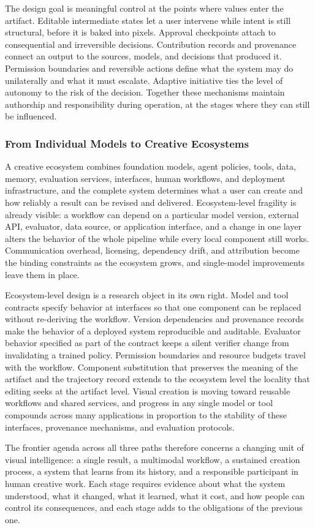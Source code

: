 The design goal is meaningful control at the points where values enter the artifact. Editable intermediate states let a user intervene while intent is still structural, before it is baked into pixels. Approval checkpoints attach to consequential and irreversible decisions. Contribution records and provenance connect an output to the sources, models, and decisions that produced it. Permission boundaries and reversible actions define what the system may do unilaterally and what it must escalate. Adaptive initiative ties the level of autonomy to the risk of the decision. Together these mechanisms maintain authorship and responsibility during operation, at the stages where they can still be influenced.

\subsubsection{From Individual Models to Creative Ecosystems}

A creative ecosystem combines foundation models, agent policies, tools, data, memory, evaluation services, interfaces, human workflows, and deployment infrastructure, and the complete system determines what a user can create and how reliably a result can be revised and delivered. Ecosystem-level fragility is already visible: a workflow can depend on a particular model version, external API, evaluator, data source, or application interface, and a change in one layer alters the behavior of the whole pipeline while every local component still works. Communication overhead, licensing, dependency drift, and attribution become the binding constraints as the ecosystem grows, and single-model improvements leave them in place.

Ecosystem-level design is a research object in its own right. Model and tool contracts specify behavior at interfaces so that one component can be replaced without re-deriving the workflow. Version dependencies and provenance records make the behavior of a deployed system reproducible and auditable. Evaluator behavior specified as part of the contract keeps a silent verifier change from invalidating a trained policy. Permission boundaries and resource budgets travel with the workflow. Component substitution that preserves the meaning of the artifact and the trajectory record extends to the ecosystem level the locality that editing seeks at the artifact level. Visual creation is moving toward reusable workflows and shared services, and progress in any single model or tool compounds across many applications in proportion to the stability of these interfaces, provenance mechanisms, and evaluation protocols.

The frontier agenda across all three paths therefore concerns a changing unit of visual intelligence: a single result, a multimodal workflow, a sustained creation process, a system that learns from its history, and a responsible participant in human creative work. Each stage requires evidence about what the system understood, what it changed, what it learned, what it cost, and how people can control its consequences, and each stage adds to the obligations of the previous one.

